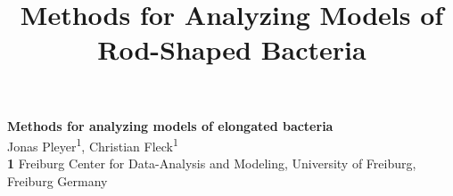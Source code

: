\documentclass[10pt,letterpaper]{article}
\title{Methods for Analyzing Models of\\ Rod-Shaped Bacteria}
\begin{document}
\begin{flushleft}
{\Large
\textbf{Methods for analyzing models of elongated bacteria}
}
\newline
\\
Jonas Pleyer\textsuperscript{1}, Christian Fleck\textsuperscript{1}\\
\bigskip
\textbf{1} Freiburg Center for Data-Analysis and Modeling, University of Freiburg, Freiburg Germany
\\
\bigskip



\end{flushleft}


\end{document}
